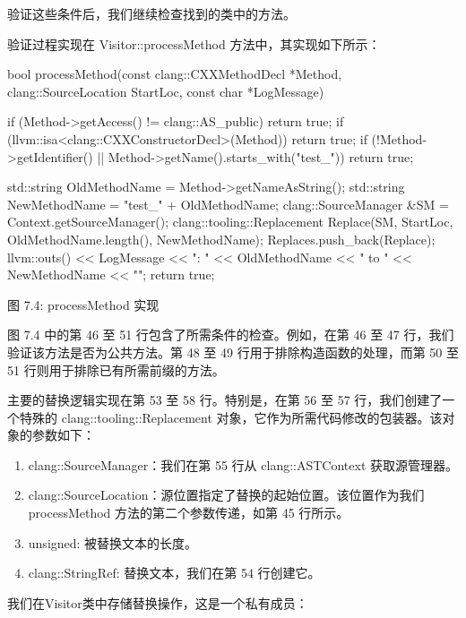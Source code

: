 验证这些条件后，我们继续检查找到的类中的方法。

验证过程实现在 Visitor::processMethod 方法中，其实现如下所示：

\begin{cpp}
bool processMethod(const clang::CXXMethodDecl *Method,
                   clang::SourceLocation StartLoc, const char *LogMessage) {
  if (Method->getAccess() != clang::AS_public)
    return true;
  if (llvm::isa<clang::CXXConstructorDecl>(Method))
    return true;
  if (!Method->getIdentifier() || Method->getName().starts_with("test_"))
    return true;

  std::string OldMethodName = Method->getNameAsString();
  std::string NewMethodName = "test_" + OldMethodName;
  clang::SourceManager &SM = Context.getSourceManager();
  clang::tooling::Replacement Replace(SM, StartLoc, OldMethodName.length(),
                                      NewMethodName);
  Replaces.push_back(Replace);
  llvm::outs() << LogMessage << ": " << OldMethodName << " to "
               << NewMethodName << "\n";
  return true;
}
\end{cpp}

\begin{center}
图 7.4: processMethod 实现
\end{center}

图 7.4 中的第 46 至 51 行包含了所需条件的检查。例如，在第 46 至 47 行，我们验证该方法是否为公共方法。第 48 至 49 行用于排除构造函数的处理，而第 50 至 51 行则用于排除已有所需前缀的方法。

主要的替换逻辑实现在第 53 至 58 行。特别是，在第 56 至 57 行，我们创建了一个特殊的 clang::tooling::Replacement 对象，它作为所需代码修改的包装器。该对象的参数如下：

\begin{enumerate}
\item
clang::SourceManager：我们在第 55 行从 clang::ASTContext 获取源管理器。

\item
clang::SourceLocation：源位置指定了替换的起始位置。该位置作为我们 processMethod 方法的第二个参数传递，如第 45 行所示。

\item
unsigned: 被替换文本的长度。

\item
clang::StringRef: 替换文本，我们在第 54 行创建它。
\end{enumerate}

我们在Visitor类中存储替换操作，这是一个私有成员：

